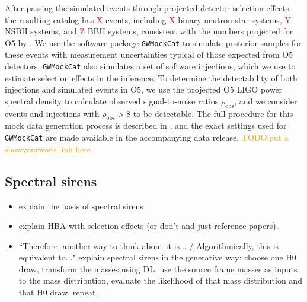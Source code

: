 \documentclass[]{aastex631}
\newcommand{\result}[1]{\textcolor{red}{#1}}
\newcommand{\comment}[1]{\textcolor{orange}{#1}}
\begin{document}
After passing the simulated events through projected detector selection effects, the resulting catalog has \result{X} events, including \result{X} binary neutron star systems, \result{Y} NSBH systems, and \result{Z} BBH systems, consistent with the numbers projected for O5 by \citet{kiendrebogo_observing_2023}.
We use the software package \texttt{GWMockCat} \citep{farah_things_2023} to simulate posterior samples for these events with measurement uncertainties typical of those expected from O5 detectors.
\texttt{GWMockCat} also simulates a set of software injections, which we use to estimate selection effects in the inference.
To determine the detectability of both injections and simulated events in O5, we use the projected O5 LIGO power spectral density \citep{dcc page} to calculate observed signal-to-noise ratios $\rho_{\text{obs}}$, and we consider events and injections with $\rho_{\text{obs}}>8$ to be detectable. 
The full procedure for this mock data generation process is described in \citet{fishbach_where, farah_things_2023, essick_dagnabbit_2023}, and the exact settings used for \texttt{GWMockCat} are made available in the accompanying data release. \comment{TODO:put a showyourwork link here.}

\subsection{Spectral sirens}
\label{sec:ss}
\begin{itemize}
    \item explain the basis of spectral sirens
    \item explain HBA with selection effects (or don't and just reference papers).
    \item ``Therefore, another way to think about it is... / Algorithmically, this is equivalent to..." explain spectral sirens in the generative way: choose one H0 draw, transform the masses using DL, use the source frame masses as inputs to the mass distribution, evaluate the likelihood of that mass distribution and that H0 draw, repeat.
\end{itemize}
\end{document}

